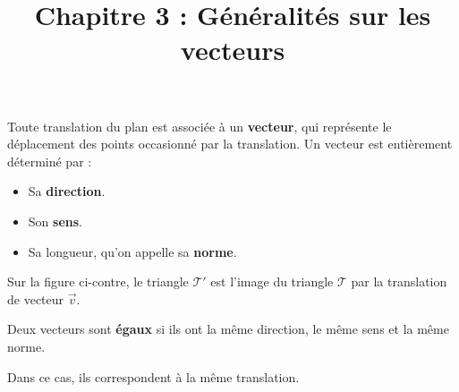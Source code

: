 \documentclass[
	classe=$2^{de}$,
	headerTitle=Généralités\space sur\space les\space vecteurs
]{coursclass}
\title{Chapitre 3 : Généralités sur les vecteurs}
\date{}
\author{}
\begin{document}
\maketitle

\begin{definition}[Vecteurs]
	Toute translation du plan est associée à un \textbf{vecteur}, qui représente le déplacement des points occasionné par la translation. Un vecteur est entièrement déterminé par :
	\begin{itemize}
		\item Sa \textbf{direction}.
		\item Son \textbf{sens}.
		\item Sa longueur, qu'on appelle sa \textbf{norme}.
	\end{itemize}
\end{definition}

\begin{exemple}
	\begin{multicols}{2}

		\columnbreak

		Sur la figure ci-contre, le triangle $\mathcal{T}'$ est l'image du triangle $\mathcal{T}$ par la translation de vecteur $\vec{v}$.
	\end{multicols}
\end{exemple}

\begin{definition}
	Deux vecteurs sont \textbf{égaux} si ils ont la même direction, le même sens et la même norme.

	Dans ce cas, ils correspondent à la même translation.
\end{definition}
\end{document}
